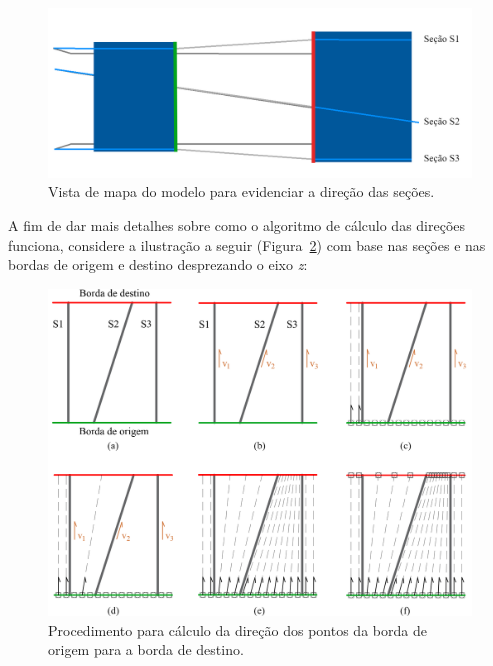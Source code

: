 \begin{figure} [H]
  \begin{center}
    \includegraphics[width=350pt]{images/fig-select-borders-3}
    \caption{Vista de mapa do modelo para evidenciar a direção das seções.}\label{fig-select-borders-3}
  \end{center}
\end{figure}

A fim de dar mais detalhes sobre como o algoritmo de cálculo das direções funciona, considere a ilustração a seguir (Figura~\ref{fig-select-borders-4}) com base nas seções e nas bordas de origem e destino desprezando o eixo \textit{z}:

\begin{figure} [H]
  \begin{center}
    \includegraphics[width=370pt]{images/fig-select-borders-4}
    \caption{Procedimento para cálculo da direção dos pontos da borda de origem para a borda de destino.}\label{fig-select-borders-4}
  \end{center}
\end{figure}

